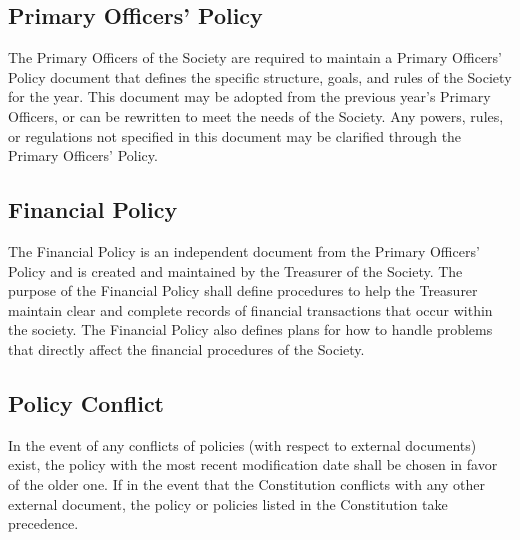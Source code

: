 \documentclass[american]{article}
\begin{document}
\subsection{Primary Officers' Policy}
The Primary Officers of the Society are required to maintain a Primary Officers' Policy document that defines the specific structure, goals, and rules of the Society for the year. This document may be adopted from the previous year's Primary Officers, or can be rewritten to meet the needs of the Society. Any powers, rules, or regulations not specified in this document may be clarified through the Primary Officers' Policy.

\subsection{Financial Policy}
The Financial Policy is an independent document from the Primary Officers' Policy and is created and maintained by the Treasurer of the Society. The purpose of the Financial Policy shall define procedures to help the Treasurer maintain clear and complete records of financial transactions that occur within the society. The Financial Policy also defines plans for how to handle problems that directly affect the financial procedures of the Society.

\subsection{Policy Conflict}
In the event of any conflicts of policies (with respect to external documents) exist, the policy with the most recent modification date shall be chosen in favor of the older one. If in the event that the Constitution conflicts with any other external document, the policy or policies listed in the Constitution take precedence.
\end{document}
